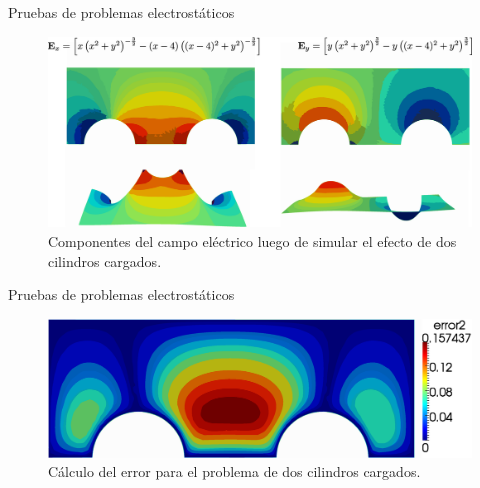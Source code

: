 \documentclass[xcolor=table,serif]{beamer}
\begin{document}
	\begin{frame}{Pruebas de problemas electrostáticos}
		\begin{figure}
		\centering
		\includegraphics[scale=0.18]{two_cylinders.eps}
		\caption{Componentes del campo eléctrico luego de simular el efecto de dos cilindros cargados.}
		\end{figure}
	\end{frame}
	\begin{frame}{Pruebas de problemas electrostáticos}
		\begin{figure}
		\centering
		\includegraphics[scale=0.4]{two_cylinders_error.eps}
		\caption{Cálculo del error para el problema de dos cilindros cargados.}
		\end{figure}
	\end{frame}
\end{document}
